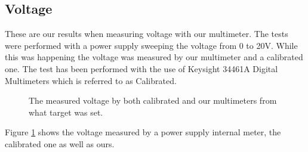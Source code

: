 \subsection{Voltage}
\label{sec:results_voltage}

These are our results when measuring voltage with our multimeter. The tests were performed with a power supply sweeping the voltage from 0 to 20V. While this was happening the voltage was measured by our multimeter and a calibrated one. The test has been performed with the use of Keysight 34461A Digital Multimeters which is referred to as Calibrated.

\begin{figure}[h]
    \centering


    \caption{The measured voltage by both calibrated and our multimeters from what target was set.}
    \label{fig:ResVoltageMeas}
    
\end{figure}
Figure \ref{fig:ResVoltageMeas} shows the voltage measured by a power supply internal meter, the calibrated one as well as ours.

